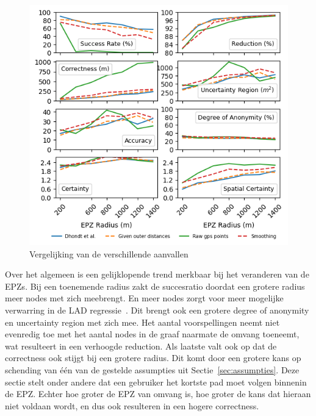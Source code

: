 \begin{figure}[h]
    \centering
    \includegraphics[width=\textwidth]{fig/result_graphs/all_results.png}
    \caption{Vergelijking van de verschillende aanvallen}\label{fig:attack_comparison}
\end{figure}

Over het algemeen is een gelijklopende trend merkbaar bij het veranderen van de
\acp{EPZ}. Bij een toenemende radius zakt de succesratio doordat een grotere
radius meer nodes met zich meebrengt. En meer nodes zorgt voor meer mogelijke
verwarring in de \ac{LAD} regressie~\cite{Verdonck_2022}. Dit brengt ook een
grotere degree of anonymity en uncertainty region met zich mee. Het aantal
voorspellingen neemt niet evenredig toe met het aantal nodes in de graaf
naarmate de omvang toeneemt, wat resulteert in een verhoogde reduction. Als
laatste valt ook op dat de correctness ook stijgt bij een grotere radius. Dit
komt door een grotere kans op schending van één van de gestelde assumpties uit
Sectie~\ref{sec:assumpties}. Deze sectie stelt onder andere dat een gebruiker
het kortste pad moet volgen binnenin de \ac{EPZ}. Echter hoe groter de \ac{EPZ}
van omvang is, hoe groter de kans dat hieraan niet voldaan wordt, en dus ook
resulteren in een hogere correctness.

